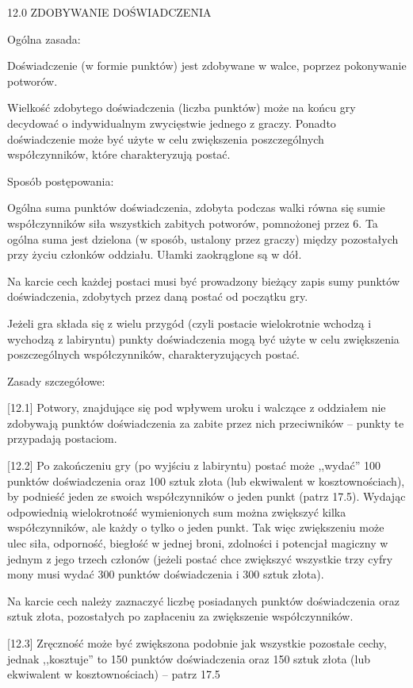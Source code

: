 12.0 ZDOBYWANIE DOŚWIADCZENIA

Ogólna zasada:

Doświadczenie (w formie punktów) jest zdobywane w walce, poprzez pokonywanie potworów.

Wielkość zdobytego doświadczenia (liczba punktów) może na końcu gry decydować o indywidualnym zwycięstwie jednego z graczy.
Ponadto doświadczenie może być użyte w celu zwiększenia poszczególnych współczynników, które charakteryzują postać.

Sposób postępowania:

Ogólna suma punktów doświadczenia, zdobyta podczas walki równa się sumie współczynników siła wszystkich zabitych potworów, pomnożonej przez 6.
Ta ogólna suma jest dzielona (w sposób, ustalony przez graczy) między pozostałych przy życiu członków oddziału.
Ułamki zaokrąglone są w dół.

Na karcie cech każdej postaci musi być prowadzony bieżący zapis sumy punktów doświadczenia, zdobytych przez daną postać od początku gry.

Jeżeli gra składa się z wielu przygód (czyli postacie wielokrotnie wchodzą i wychodzą z labiryntu) punkty doświadczenia mogą być użyte w celu zwiększenia poszczególnych współczynników, charakteryzujących postać.

Zasady szczegółowe:

[12.1] Potwory, znajdujące się pod wpływem uroku i walczące z oddziałem nie zdobywają punktów doświadczenia za zabite przez nich przeciwników – punkty te przypadają postaciom.

[12.2] Po zakończeniu gry (po wyjściu z labiryntu) postać może ,,wydać'' 100 punktów doświadczenia oraz 100 sztuk złota (lub ekwiwalent w kosztownościach), by podnieść jeden ze swoich współczynników o jeden punkt (patrz 17.5).
Wydając odpowiednią wielokrotność wymienionych sum można zwiększyć kilka współczynników, ale każdy o tylko o jeden punkt.
Tak więc zwiększeniu może ulec siła, odporność, biegłość w jednej broni, zdolności i potencjał magiczny w jednym z jego trzech członów (jeżeli postać chce zwiększyć wszystkie trzy cyfry mony musi wydać 300 punktów doświadczenia i 300 sztuk złota).

Na karcie cech należy zaznaczyć liczbę posiadanych punktów doświadczenia oraz sztuk złota, pozostałych po zapłaceniu za zwiększenie współczynników.

[12.3] Zręczność może być zwiększona podobnie jak wszystkie pozostałe cechy, jednak ,,kosztuje'' to 150 punktów doświadczenia oraz 150 sztuk złota (lub ekwiwalent w kosztownościach) – patrz 17.5